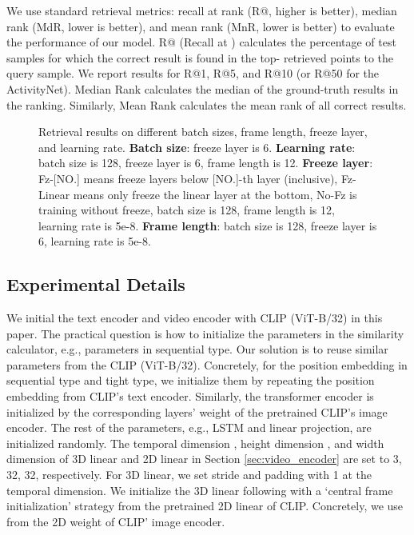 \documentclass[11pt]{article}
\begin{document}
	We use standard retrieval metrics: recall at rank  (R@, higher is better), median rank (MdR, lower is better), and mean rank (MnR, lower is better) to evaluate the performance of our model. R@ (Recall at ) calculates the percentage of test samples for which the correct result is found in the top- retrieved points to the query sample. We report results for R@1, R@5, and R@10 (or R@50 for the ActivityNet). Median Rank calculates the median of the ground-truth results in the ranking. Similarly, Mean Rank calculates the mean rank of all correct results.
	\begin{figure*}[tbp]
		\centering
		\caption{Retrieval results on different batch sizes, frame length, freeze layer, and learning rate. \textbf{Batch size}: freeze layer is 6. \textbf{Learning rate}: batch size is 128, freeze layer is 6, frame length is 12. \textbf{Freeze layer}: Fz-[NO.] means freeze layers below [NO.]-th layer (inclusive), Fz-Linear means only freeze the linear layer at the bottom, No-Fz is training without freeze, batch size is 128, frame length is 12, learning rate is 5e-8. \textbf{Frame length}: batch size is 128, freeze layer is 6, learning rate is 5e-8.}\label{fig_study_sdy_fig}
	\end{figure*}

	\subsection{Experimental Details}
	We initial the text encoder and video encoder with CLIP (ViT-B/32) \cite{radford2021learning} in this paper. The practical
	question is how to initialize the parameters in the similarity calculator, e.g., parameters in sequential type. Our solution is to reuse similar parameters from the CLIP (ViT-B/32). Concretely, for the position embedding in sequential type and tight type, we initialize them by repeating the position embedding from CLIP's text encoder. Similarly, the transformer encoder is initialized by the corresponding layers' weight of the pretrained CLIP's image encoder. The rest of the parameters, e.g., LSTM and linear projection, are initialized randomly. The temporal dimension , height dimension , and width dimension  of 3D linear and 2D linear in Section \ref{sec:video_encoder} are set to 3, 32, 32, respectively. For 3D linear, we set stride and padding with 1 at the temporal dimension. We initialize the 3D linear following \cite{arnab2021vivit} with a `central frame initialization' strategy from the pretrained 2D linear of CLIP. Concretely, we use  from the 2D weight  of CLIP' image encoder.
\end{document}
